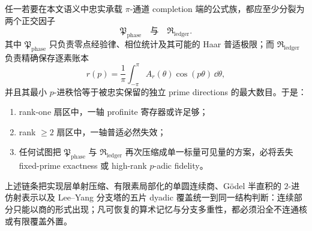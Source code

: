 \begin{conjecture}\label{conj:conclusion-faithful-pi-formula-phase-ledger-splitting}
任一若要在本文语义中忠实承载 \(\pi\)-通道 completion 端的公式族，都应至少分裂为两个正交因子
\[
\mathfrak P_{\mathrm{phase}}
\quad\text{与}\quad
\mathfrak R_{\mathrm{ledger}}.
\]
其中 \(\mathfrak P_{\mathrm{phase}}\) 只负责零点经验律、相位统计及其可能的 Haar 普适极限；而 \(\mathfrak R_{\mathrm{ledger}}\) 负责精确保存逐素账本
\[
r(p)=\frac1\pi\int_{-\pi}^{\pi}A_r(\theta)\cos(p\theta)\,\dd\theta,
\]
并且其最小 \(p\)-进秩恰等于被忠实保留的独立 prime directions 的最大数目。于是：
\begin{enumerate}
  \item rank-one 扇区中，一轴 profinite 寄存器或许足够；
  \item rank \(\ge 2\) 扇区中，一轴普适必然失效；
  \item 任何试图把 \(\mathfrak P_{\mathrm{phase}}\) 与 \(\mathfrak R_{\mathrm{ledger}}\) 再次压缩成单一标量可见量的方案，必将丢失 fixed-prime exactness 或 high-rank \(p\)-adic fidelity。
\end{enumerate}
\end{conjecture}

\noindent
上述链条把实现层单射压缩、有限素局部化的单圆连续商、Gödel 半直积的 \(2\)-进仿射表示以及 Lee--Yang 分支塔的五片 dyadic 覆盖统一到同一结构判断：连续部分只能以商的形式出现；凡可恢复的算术记忆与分支多重性，都必须沿全不连通核或有限覆盖外置。
